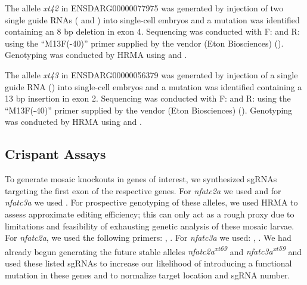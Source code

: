 The allele \textit{xt42} in ENSDARG00000077975 was generated by injection of two single guide RNAs ( and ) into single\hyp{}cell embryos and a mutation was identified containing an 8 bp deletion in exon 4. Sequencing was conducted with F:  and R:  using the ``M13F(\hyp{}40)'' primer supplied by the vendor (Eton Biosciences) (). Genotyping was conducted by HRMA using  and .

The allele \textit{xt43} in ENSDARG00000056379 was generated by injection of a single guide RNA () into single\hyp{}cell embryos and a mutation was identified containing a 13 bp insertion in exon 2. Sequencing was conducted with F:  and R:  using the ``M13F(\hyp{}40)'' primer supplied by the vendor (Eton Biosciences) (). Genotyping was conducted by HRMA using  and .

\subsection{Crispant Assays}\label{crispants}

To generate mosaic knockouts in genes of interest, we synthesized sgRNAs targeting the first exon of the respective genes. For \textit{nfatc2a} we used  and for \textit{nfatc3a} we used . For prospective genotyping of these alleles, we used HRMA to assess approximate editing efficiency; this can only act as a rough proxy due to limitations and feasibility of exhausting genetic analysis of these mosaic larvae. For \textit{nfatc2a}, we used the following primers: , . For \textit{nfatc3a} we used: , . We had already begun generating the future stable alleles \textit{nfatc2a\textsuperscript{xt69}} and \textit{nfatc3a\textsuperscript{xt59}} and used these listed sgRNAs to increase our likelihood of introducing a functional mutation in these genes and to normalize target location and sgRNA number.

